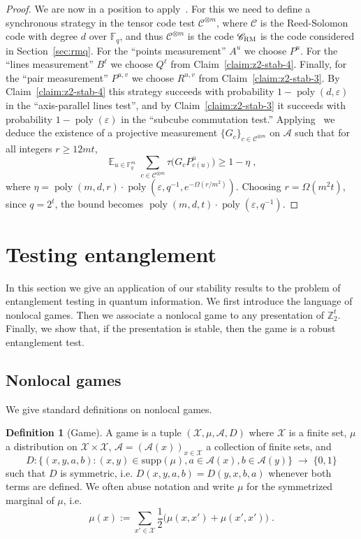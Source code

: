 \documentclass[11pt]{article}
\theoremstyle{definition}
\newtheorem{definition}[theorem]{Definition}
\newcommand{\code}{\mathscr{C}}
\DeclareMathOperator*{\Expectation}{\mathbb{E}}
\newcommand{\Es}[1]{\Expectation_{#1}}
\newcommand{\F}{\ensuremath{\mathbb{F}}}
\newcommand{\Z}{\ensuremath{\mathbb{Z}}}
\newcommand{\mA}{\ensuremath{\mathcal{A}}}
\newcommand{\mX}{\ensuremath{\mathcal{X}}}
\newcommand{\RM}{\ensuremath{\textsc{RM}}}
\DeclareMathOperator{\poly}{poly}
\newcommand{\eps}{\varepsilon}
\begin{document}
\begin{proof}
We are now in a position to apply~\cite[Theorem 4.1]{ji2022quantum}. For this we need to define a synchronous strategy in the tensor code test $\code^{\otimes m}$, where $\code$ is the Reed-Solomon code with degree $d$ over $\F_q$, and thus $\code^{\otimes m}$ is the code $\code_\RM$ is the code considered in Section~\ref{sec:rmq}. For the ``points measurement'' $A^u$ we choose $P^u$. For the ``lines measurement'' $B^\ell$ we choose $Q^\ell$ from Claim~\ref{claim:z2-stab-4}. Finally, for the ``pair measurement'' $P^{u,v}$ we choose $R^{u,v}$ from Claim~\ref{claim:z2-stab-3}. By Claim~\ref{claim:z2-stab-4} this strategy succeeds with probability $1-\poly(d,\eps)$ in the ``axis-parallel lines test'', and by Claim~\ref{claim:z2-stab-3} it succeeds with probability $1-\poly(\eps)$ in the ``subcube commutation test.'' Applying~\cite[Theorem 4.1]{ji2022quantum} we deduce the existence of a projective measurement $\{G_c\}_{c\in\code^{\otimes m}}$ on $\mA$ such that for all integers $r \geq 12mt$,
\[ \Es{u\in\F_q^m} \sum_{c\in\code^{\otimes m}} \tau\big( G_c P^u_{c(u)}\big) \geq 1-\eta\;,\]
where $\eta = \poly(m,d,r) \cdot\poly(\eps,q^{-1},e^{-\Omega(r/m^2)})$. Choosing $r=\Omega(m^2 t)$, since $q=2^{t}$, the bound becomes $\poly(m,d,t) \cdot\poly(\eps,q^{-1})$.

\end{proof}


\section{Testing entanglement}
\label{sec:quantum}

In this section we give an application of our stability results to the problem of entanglement testing in quantum information. We first introduce the language of nonlocal games. Then we associate a nonlocal game to any presentation of $\Z_2^t$. Finally, we show that, if the presentation is stable, then the game is a robust  entanglement test. 
	
\subsection{Nonlocal games}
\label{sec:nl-games}

We give standard definitions on nonlocal games. 

\begin{definition}[Game]
A game is a tuple $(\mX,\mu,\mA,D)$ where $\mX$ is a finite set, $\mu$ a distribution on $\mX\times \mX$, $\mA=(\mA(x))_{x\in\mX}$ a collection of finite sets, and 
\[ D: \big\{ (x,y,a,b) : (x,y)\in\text{supp}(\mu),a\in\mA(x),b\in\mA(y)\big\} \;\to\;\{0,1\}\]
such that $D$ is symmetric, i.e. $D(x,y,a,b)=D(y,x,b,a)$ whenever both terms are defined. We often abuse notation and write $\mu$ for the symmetrized marginal of $\mu$, i.e.\ 
\[\mu(x) := \sum_{x'\in \mX} \frac{1}{2}\big(\mu(x,x')+\mu(x',x')\big)\;.\]
\end{definition}
\end{document}

